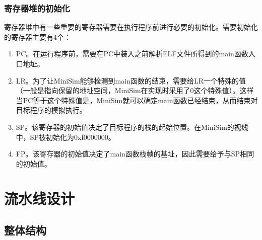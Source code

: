 \documentclass[12pt,a4paper,Flow]{report}
\begin{document}
\subsection{寄存器堆的初始化}
寄存器堆中有一些重要的寄存器需要在执行程序前进行必要的初始化。需要初始化的寄存器主要有4个：
\begin{enumerate}
\item PC。在运行程序前，需要在PC中装入之前解析ELF文件所得到的main函数入口地址。
\item LR。为了让MiniSim能够检测到main函数的结束，需要给LR一个特殊的值（一般是指向保留的地址空间，MiniSim在实现时采用了0这个特殊值）。这样当PC等于这个特殊值是，MiniSim就可以确定main函数已经结束，从而结束对目标程序的模拟执行。
\item SP。该寄存器的初始值决定了目标程序的栈的起始位置。在MiniSim的视线中，SP被初始化为0xf0000000。
\item FP。该寄存器的初始值决定了main函数栈帧的基址，因此需要给予与SP相同的初始值。
\end{enumerate}
\chapter{流水线设计}
\section{整体结构}
\end{document}
